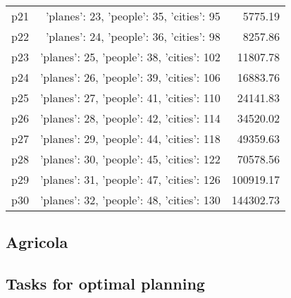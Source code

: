 \documentclass{article}
\begin{document}
\begin{center}
\begin{tabular}{@{}l|r|r@{}}
  p21&{'planes': 23, 'people': 35, 'cities': 95}&5775.19\\
  p22&{'planes': 24, 'people': 36, 'cities': 98}&8257.86\\
  p23&{'planes': 25, 'people': 38, 'cities': 102}&11807.78\\
  p24&{'planes': 26, 'people': 39, 'cities': 106}&16883.76\\
  p25&{'planes': 27, 'people': 41, 'cities': 110}&24141.83\\
  p26&{'planes': 28, 'people': 42, 'cities': 114}&34520.02\\
  p27&{'planes': 29, 'people': 44, 'cities': 118}&49359.63\\
  p28&{'planes': 30, 'people': 45, 'cities': 122}&70578.56\\
  p29&{'planes': 31, 'people': 47, 'cities': 126}&100919.17\\
  p30&{'planes': 32, 'people': 48, 'cities': 130}&144302.73
                            \end{tabular}
                            \end{center}
                    
                            \newpage \subsection{Agricola}
                    \subsection*{Tasks for optimal planning}
                    
\end{document}
